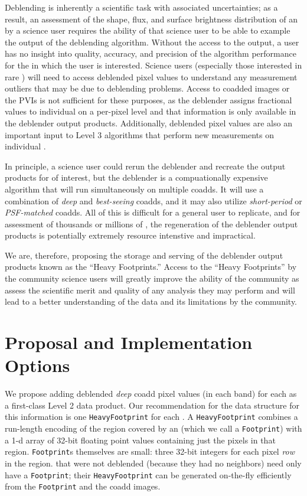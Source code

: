 \documentclass[DM,lsstdraft,toc]{lsstdoc}
\begin{document}
Deblending is inherently a scientific task with associated uncertainties; as a result, an assessment of the shape, flux, and surface brightness distribution of an \Object by a science user requires the ability of that science user to be able to example the output of the deblending algorithm.  Without the access to the output, a user has no insight into quality, accuracy, and precision of the algorithm performance for the \Objects in which the user is interested.  Science users (especially those interested in rare \Objects) will need to access deblended pixel values to understand any measurement outliers that may be due to deblending problems.  Access to coadded images or the PVIs is not sufficient for these purposes, as the deblender assigns fractional values to individual \Objects on a per-pixel level and that information is only available in the deblender output products.  Additionally, deblended pixel values are also an important input to Level 3 algorithms that perform new measurements on individual \Objects.

In principle, a science user could rerun the deblender and recreate the output products for \Objects of interest, but the deblender is a compuationally expensive algorithm that will run simultaneously on multiple coadds.  It will use a combination of \emph{deep} and \emph{best-seeing} coadds, and it may also utilize \emph{short-period} or \emph{PSF-matched} coadds.  All of this is difficult for a general user to replicate, and for assessment of thousands or millions of \Objects, the regeneration of the deblender output products is potentially extremely resource intenstive and impractical.

We are, therefore, proposing the storage and serving of the deblender output products known as the ``Heavy Footprints.''  Access to the ``Heavy Footprints'' by the community science users will greatly improve the ability of the community as assess the scientific merit and quality of any analysis they may perform and will lead to a better understanding of the data and its limitations by the community.

\section{Proposal and Implementation Options}

We propose adding deblended \emph{deep} coadd pixel values (in each band) for each \Object as a first-class Level 2 data product.  Our recommendation for the data structure for this information is one \texttt{HeavyFootprint} for each \Object.  A \texttt{HeavyFootprint} combines a run-length encoding of the region covered by an \Object (which we call a \texttt{Footprint}) with a 1-d array of 32-bit floating point values containing just the pixels in that region.  \texttt{Footprint}s themselves are small: three 32-bit integers for each pixel \emph{row} in the region.  \Objects that were not deblended (because they had no neighbors) need only have a \texttt{Footprint}; their \texttt{HeavyFootprint} can be generated on-the-fly efficiently from the \texttt{Footprint} and the coadd images.
\end{document}
